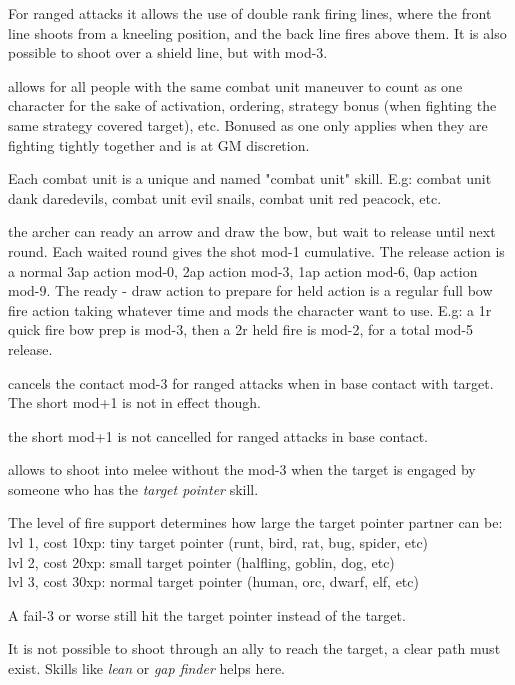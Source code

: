 For ranged attacks it allows the use of double rank firing lines, where the front line shoots from a kneeling position, and the back line fires above them. It is also possible to shoot over a shield line, but with mod-3.


 allows for all people with the same combat unit maneuver to count as one character for the sake of activation, ordering, strategy bonus (when fighting the same strategy covered target), etc. Bonused as one only applies when they are fighting tightly together and is at GM discretion.

Each combat unit is a unique and named "combat unit" skill. E.g: combat unit dank daredevils, combat unit evil snails, combat unit red peacock, etc.


 the archer can ready an arrow and draw the bow, but wait to release until next round. Each waited round gives the shot mod-1 cumulative. The release action is a normal 3ap action mod-0, 2ap action mod-3, 1ap action mod-6, 0ap action mod-9.
The ready - draw action to prepare for held action is a regular full bow fire action taking whatever time and mods the character want to use.
E.g: a 1r quick fire bow prep is mod-3, then a 2r held fire is mod-2, for a total mod-5 release.


 cancels the contact mod-3 for ranged attacks when in base contact with target. The short mod+1 is not in effect though.


 the short mod+1 is not cancelled for ranged attacks in base contact.


 allows to shoot into melee without the mod-3 when the target is engaged by someone who has the \emph{target pointer} skill.

The level of fire support determines how large the target pointer partner can be:\\
lvl 1, cost 10xp: tiny target pointer (runt, bird, rat, bug, spider, etc) \\
lvl 2, cost 20xp: small target pointer (halfling, goblin, dog, etc) \\
lvl 3, cost 30xp: normal target pointer (human, orc, dwarf, elf, etc)

A fail-3 or worse still hit the target pointer instead of the target.

It is not possible to shoot through an ally to reach the target, a clear path must exist. Skills like \emph{lean} or \emph{gap finder} helps here.

